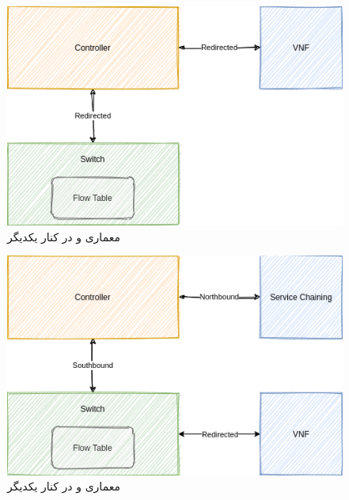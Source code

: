 \documentclass[dvipsnames]{beamer}
\begin{document}
\begin{persian}
	\begin{frame}{}
		\begin{center}\begin{figure}
			\includegraphics[scale=0.4]{images/fahmin2017-1.png}
			\caption{معماری  و   در کنار یکدیگر}
		\end{figure}\end{center}
	\end{frame}

	\begin{frame}{}
		\begin{center}\begin{figure}
			\includegraphics[scale=0.4]{images/fahmin2017-2.png}
			\caption{معماری  و   در کنار یکدیگر}
		\end{figure}\end{center}
	\end{frame}


\end{persian}
\end{document}
